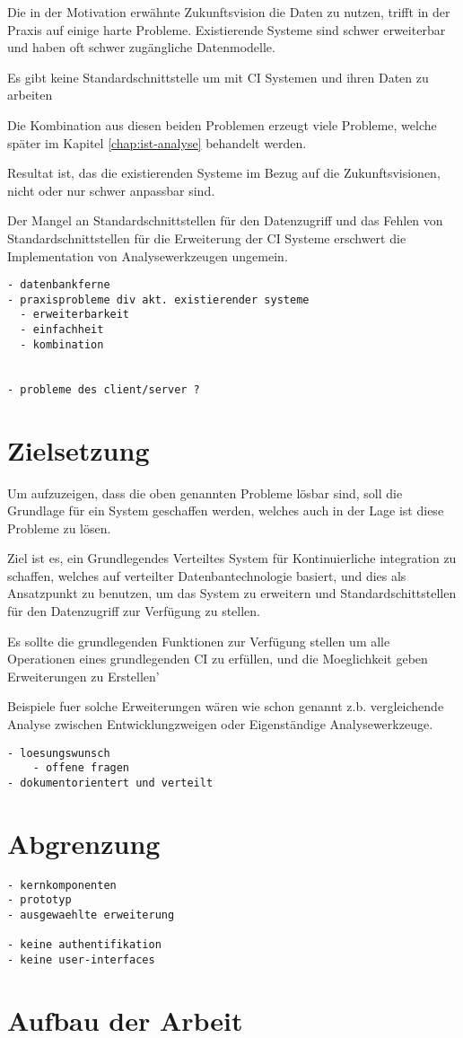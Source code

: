 Die in der Motivation erw\"ahnte Zukunftsvision die Daten zu nutzen,
trifft in der Praxis auf einige harte Probleme.
Existierende Systeme sind schwer erweiterbar und haben oft schwer zugängliche Datenmodelle.

Es gibt keine Standardschnittstelle um mit CI Systemen und ihren Daten zu arbeiten

Die Kombination aus diesen beiden Problemen erzeugt viele Probleme,
welche später im Kapitel \ref{chap:ist-analyse} behandelt werden.

Resultat ist, das die existierenden Systeme im Bezug auf die Zukunftsvisionen,
nicht oder nur schwer anpassbar sind.

Der Mangel an Standardschnittstellen für den Datenzugriff und
das Fehlen von Standardschnittstellen für die Erweiterung der CI Systeme
erschwert die Implementation von Analysewerkzeugen ungemein.





\begin{verbatim}
- datenbankferne
- praxisprobleme div akt. existierender systeme
  - erweiterbarkeit
  - einfachheit
  - kombination


- probleme des client/server ?

\end{verbatim}

\section{Zielsetzung}

Um aufzuzeigen, dass die oben genannten Probleme lösbar sind,
soll die Grundlage für ein System geschaffen werden,
welches auch in der Lage ist diese Probleme zu lösen.

Ziel ist es, ein Grundlegendes Verteiltes System f\"ur Kontinuierliche integration zu schaffen,
welches auf verteilter Datenbantechnologie basiert,
und dies als Ansatzpunkt zu benutzen,
um das System zu erweitern und Standardschittstellen f\"ur den Datenzugriff zur Verf\"ugung zu stellen.

Es sollte die grundlegenden Funktionen zur Verfügung stellen um alle Operationen
eines grundlegenden CI zu erf\"ullen,
und die Moeglichkeit geben Erweiterungen zu Erstellen'

Beispiele fuer solche Erweiterungen wären wie schon genannt
z.b. vergleichende Analyse zwischen Entwicklungzweigen oder Eigenständige Analysewerkzeuge.

\begin{verbatim}
- loesungswunsch
    - offene fragen
- dokumentorientert und verteilt
\end{verbatim}

\section{Abgrenzung}

\begin{verbatim}
- kernkomponenten
- prototyp
- ausgewaehlte erweiterung

- keine authentifikation
- keine user-interfaces

\end{verbatim}

\section{Aufbau der Arbeit}



